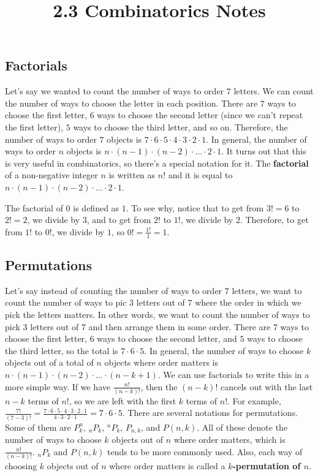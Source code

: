 \documentclass[twocolumn]{article}
\title{2.3 Combinatorics Notes}
\author{}
\date{}
\begin{document}
\maketitle

\subsection*{Factorials}
Let's say we wanted to count the number of ways to order $7$ letters. We can 
count the number of ways to choose the letter in each position. There are $7$ 
ways to choose the first letter, $6$ ways to choose the second letter (since we 
can't repeat the first letter), $5$ ways to choose the third letter, and so on. 
Therefore, the number of ways to order $7$ objects is $7 \cdot 6 \cdot 5 \cdot 4 
\cdot 3 \cdot 2 \cdot 1$. In general, the number of ways to order $n$ objects is 
$n \cdot (n - 1) \cdot (n - 2) \cdot \dots \cdot 2 \cdot 1$. It turns out that 
this is very useful in combinatorics, so there's a special notation for it. The 
\textbf{factorial} of a non-negative integer $n$ is written as $n!$ and it is 
equal to $n \cdot (n - 1) \cdot (n - 2) \cdot \dots \cdot 2 \cdot 1$.

The factorial of $0$ is defined as $1$. To see why, notice that to get from $3!  
= 6$ to $2! = 2$, we divide by $3$, and to get from $2!$ to $1!$, we divide by 
$2$. Therefore, to get from $1!$ to $0!$, we divide by $1$, so $0! = 
\frac{1!}{1} = 1$.

\subsection*{Permutations}
Let's say instead of counting the number of ways to order $7$ letters, we want 
to count the number of ways to pic $3$ letters out of $7$ where the order in 
which we pick the letters matters. In other words, we want to count the number 
of ways to pick $3$ letters out of $7$ and then arrange them in some order. 
There are $7$ ways to choose the first letter, $6$ ways to choose the second 
letter, and $5$ ways to choose the third letter, so the total is $7 \cdot 6 
\cdot 5$. In general, the number of ways to choose $k$ objects out of a total of 
$n$ objects where order matters is $n \cdot (n - 1) \cdot (n - 2) \cdot \dots 
\cdot (n - k + 1)$. We can use factorials to write this in a more simple way. If 
we have $\frac{n!}{(n - k)!}$, then the $(n - k)!$ cancels out with the last $n 
- k$ terms of $n!$, so we are left with the first $k$ terms of $n!$. For 
example, $\frac{7!}{(7 - 3)!} = \frac{7 \cdot 6 \cdot 5 \cdot 4 \cdot 3 \cdot 2 
\cdot 1}{4 \cdot 3 \cdot 2 \cdot 1} = 7 \cdot 6 \cdot 5$. There are several 
notations for permutations. Some of them are $P^n_k$, $_nP_k$, $^nP_k$, $P_{n, 
k}$, and $P(n, k)$. All of these denote the number of ways to choose $k$ objects 
out of $n$ where order matters, which is $\frac{n!}{(n - k)!}$. $_nP_k$ and 
$P(n, k)$ tends to be more commonly used. Also, each way of choosing $k$ objects 
out of $n$ where order matters is called a \textbf{$k$-permutation of $n$}.
\end{document}
